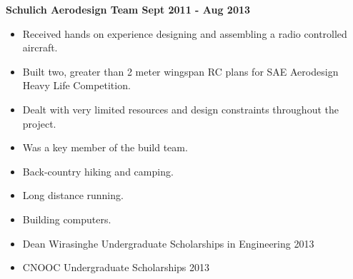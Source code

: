 \documentclass[12pt]{article} %
\begin{document}
\noindent \centerline{ \bf Schulich Aerodesign Team \hfill Sept 2011 - Aug 2013}
\begin{itemize}[noitemsep]
  \item Received hands on experience  designing and assembling a radio controlled aircraft.
  \item Built two, greater than 2 meter wingspan RC plans for SAE Aerodesign Heavy Life Competition.
  \item Dealt with very limited resources and design constraints throughout the project.
  \item Was a key member of the build team.
\end{itemize}

\bigskip
{}
\medskip
\begin{itemize}
\item Back-country hiking and camping.
\item Long distance running.
\item Building computers.
\end{itemize}
\bigskip

\medskip
\noindent
\begin{itemize}[noitemsep]
\item Dean Wirasinghe Undergraduate Scholarships in Engineering 2013
\item CNOOC Undergraduate Scholarships 2013
\end{itemize}
\end{document}
